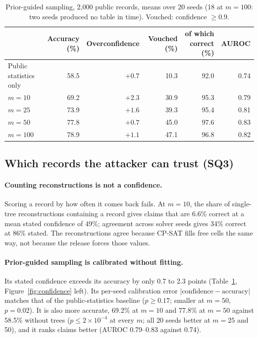 \begin{table}[t]
  \centering
  \caption{Prior-guided sampling, 2,000 public records, means over 20 seeds (18 at $m=100$: two seeds produced no table in time). Vouched: confidence $\geq0.9$.}
  \label{tab:confidence}
  \small
  \setlength{\tabcolsep}{4.5pt}
  \begin{tabular}{lrrrrr}
    \toprule
    & Accuracy (\%) & Overconfidence & Vouched (\%) & of which correct (\%) & AUROC \\
    \midrule
    Public statistics only & 58.5 & $+0.7$ & 10.3 & 92.0 & 0.74 \\
    $m=10$ & 69.2 & $+2.3$ & 30.9 & 95.3 & 0.79 \\
    $m=25$ & 73.9 & $+1.6$ & 39.3 & 95.4 & 0.81 \\
    $m=50$ & 77.8 & $+0.7$ & 45.0 & 97.6 & 0.83 \\
    $m=100$ & 78.9 & $+1.1$ & 47.1 & 96.8 & 0.82 \\
    \bottomrule
  \end{tabular}
\end{table}

\subsection{Which records the attacker can trust (SQ3)}
\paragraph{Counting reconstructions is not a confidence.} Scoring a record by how often it comes back fails. At $m=10$, the share of single-tree reconstructions containing a record gives claims that are 6.6\% correct at a mean stated confidence of 49\%; agreement across solver seeds gives 34\% correct at 86\% stated. The reconstructions agree because CP-SAT fills free cells the same way, not because the release forces those values.

\paragraph{Prior-guided sampling is calibrated without fitting.} Its stated confidence exceeds its accuracy by only 0.7 to 2.3 points (Table~\ref{tab:confidence}, Figure~\ref{fig:confidence} left). Its per-seed calibration error $|\text{confidence}-\text{accuracy}|$ matches that of the public-statistics baseline ($p\geq0.17$; smaller at $m=50$, $p=0.02$). It is also more accurate, 69.2\% at $m=10$ and 77.8\% at $m=50$ against 58.5\% without trees ($p\leq2\times10^{-4}$ at every $m$; all 20 seeds better at $m=25$ and 50), and it ranks claims better (AUROC 0.79--0.83 against 0.74).

